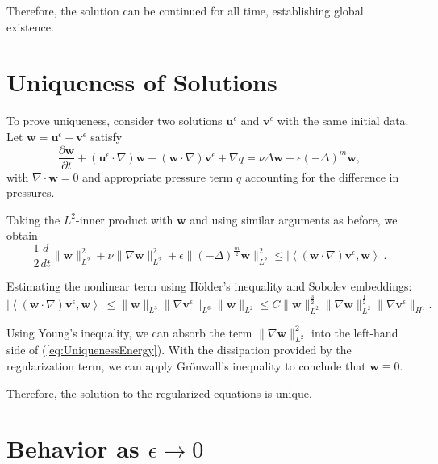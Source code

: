 \documentclass[11pt]{article}
\begin{document}
Therefore, the solution can be continued for all time, establishing global existence.

\section{Uniqueness of Solutions}

To prove uniqueness, consider two solutions $\mathbf{u}^\epsilon$ and $\mathbf{v}^\epsilon$ with the same initial data. Let $\mathbf{w} = \mathbf{u}^\epsilon - \mathbf{v}^\epsilon$ satisfy
\begin{equation}
\frac{\partial \mathbf{w}}{\partial t} + (\mathbf{u}^\epsilon \cdot \nabla) \mathbf{w} + (\mathbf{w} \cdot \nabla) \mathbf{v}^\epsilon + \nabla q = \nu \Delta \mathbf{w} - \epsilon (-\Delta)^m \mathbf{w},
\label{eq:DiffEq}
\end{equation}
with $\nabla \cdot \mathbf{w} = 0$ and appropriate pressure term $q$ accounting for the difference in pressures.

Taking the $L^2$-inner product with $\mathbf{w}$ and using similar arguments as before, we obtain
\begin{equation}
\frac{1}{2} \frac{d}{dt} \| \mathbf{w} \|_{L^2}^2 + \nu \| \nabla \mathbf{w} \|_{L^2}^2 + \epsilon \| (-\Delta)^{\frac{m}{2}} \mathbf{w} \|_{L^2}^2 \leq \left| \left\langle (\mathbf{w} \cdot \nabla) \mathbf{v}^\epsilon, \mathbf{w} \right\rangle \right|.
\label{eq:UniquenessEnergy}
\end{equation}

Estimating the nonlinear term using Hölder's inequality and Sobolev embeddings:
\begin{equation}
\left| \left\langle (\mathbf{w} \cdot \nabla) \mathbf{v}^\epsilon, \mathbf{w} \right\rangle \right| \leq \| \mathbf{w} \|_{L^3} \| \nabla \mathbf{v}^\epsilon \|_{L^6} \| \mathbf{w} \|_{L^2} \leq C \| \mathbf{w} \|_{L^2}^{\frac{3}{2}} \| \nabla \mathbf{w} \|_{L^2}^{\frac{1}{2}} \| \nabla \mathbf{v}^\epsilon \|_{H^1}.
\end{equation}

Using Young's inequality, we can absorb the term $\| \nabla \mathbf{w} \|_{L^2}^2$ into the left-hand side of (\ref{eq:UniquenessEnergy}). With the dissipation provided by the regularization term, we can apply Grönwall's inequality to conclude that $\mathbf{w} \equiv 0$.

Therefore, the solution to the regularized equations is unique.

\section{Behavior as $\epsilon \to 0$}
\end{document}

